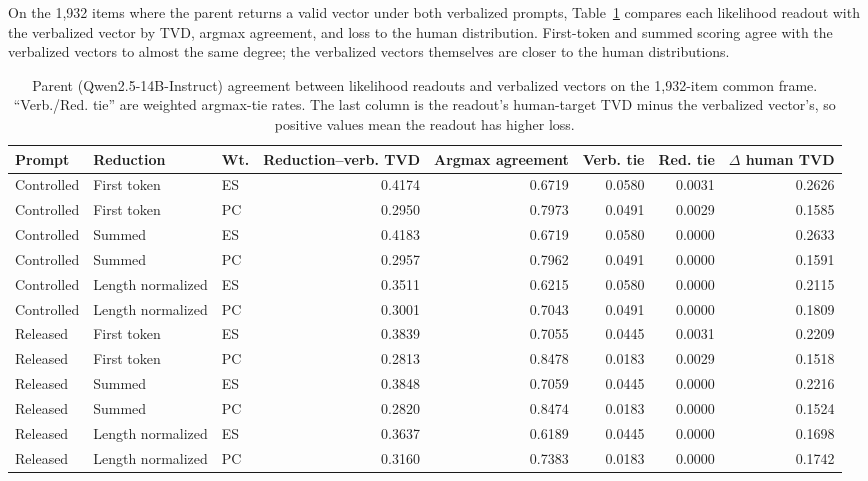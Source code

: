 \documentclass[11pt]{article}
\begin{document}
On the 1,932 items where the parent returns a valid vector under both
verbalized prompts, Table~\ref{tab:qwen14-agreement} compares each
likelihood readout with the verbalized vector by TVD, argmax agreement, and
loss to the human distribution. First-token and summed scoring agree with the
verbalized vectors to almost the same degree; the verbalized vectors themselves
are closer to the human distributions.

\begin{table}[t]
\centering\small
\setlength{\tabcolsep}{2.5pt}
\begin{tabular}{lllrrrrr}
\toprule
Prompt & Reduction & Wt. & Reduction--verb. TVD & Argmax agreement & Verb. tie & Red. tie &
$\Delta$ human TVD \\
\midrule
Controlled & First token & ES & 0.4174 & 0.6719 & 0.0580 & 0.0031 & 0.2626 \\
Controlled & First token & PC & 0.2950 & 0.7973 & 0.0491 & 0.0029 & 0.1585 \\
Controlled & Summed & ES & 0.4183 & 0.6719 & 0.0580 & 0.0000 & 0.2633 \\
Controlled & Summed & PC & 0.2957 & 0.7962 & 0.0491 & 0.0000 & 0.1591 \\
Controlled & Length normalized & ES & 0.3511 & 0.6215 & 0.0580 & 0.0000 & 0.2115 \\
Controlled & Length normalized & PC & 0.3001 & 0.7043 & 0.0491 & 0.0000 & 0.1809 \\
Released & First token & ES & 0.3839 & 0.7055 & 0.0445 & 0.0031 & 0.2209 \\
Released & First token & PC & 0.2813 & 0.8478 & 0.0183 & 0.0029 & 0.1518 \\
Released & Summed & ES & 0.3848 & 0.7059 & 0.0445 & 0.0000 & 0.2216 \\
Released & Summed & PC & 0.2820 & 0.8474 & 0.0183 & 0.0000 & 0.1524 \\
Released & Length normalized & ES & 0.3637 & 0.6189 & 0.0445 & 0.0000 & 0.1698 \\
Released & Length normalized & PC & 0.3160 & 0.7383 & 0.0183 & 0.0000 & 0.1742 \\
\bottomrule
\end{tabular}
\caption{Parent (Qwen2.5-14B-Instruct) agreement between likelihood readouts
and verbalized vectors on the 1,932-item common frame. ``Verb./Red. tie'' are
weighted argmax-tie rates. The last column is the readout's human-target TVD
minus the verbalized vector's, so positive values mean the readout has higher
loss.}
\label{tab:qwen14-agreement}
\end{table}
\end{document}

